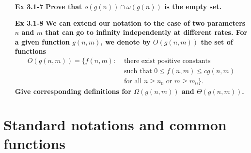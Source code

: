 \documentclass[fontsize=12pt,paper=a4,open=any]{book}
\begin{document}
\begin{enumerate}
	\item[\textbf{Ex 3.1-7}]
	\textbf{Prove that $o(g(n)) \cap \omega(g(n))$ is the empty set.}

	\item[\textbf{Ex 3.1-8}]
	\textbf{We can extend our notation to the case of two parameters $n$ and $m$ that can go to infinity independently at different rates. For a given function $g(n, m)$, we denote by $O(g(n, m))$ the set of functions
	\begin{equation*}
		\begin{split}
			O(g(n, m)) = \{f(n,m) : & \text{ there exist positive constants} \\
			& \text{ such that } 0 \leq f(n,m) \leq cg(n,m) \\ 
			& \text{ for all } n \geq n_0 \text{ or } m \geq m_0 \}.
		\end{split}
	\end{equation*}
	Give corresponding definitions for $\Omega(g(n,m))$ and $\Theta(g(n,m))$.
	}	
\end{enumerate}

\section{Standard notations and common functions}
\end{document}
